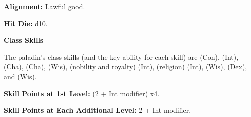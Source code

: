 
\textbf{Alignment:} Lawful good.

\textbf{Hit Die:} d10.

\textbf{Class Skills}

The paladin's class skills (and the key ability for each skill) are  
(Con),  (Int),  (Cha),  (Cha),  (Wis),  
(nobility and royalty) (Int),  (religion) (Int),  (Wis),  
(Dex), and  (Wis).

\textbf{Skill Points at 1st Level:} (2 + Int modifier) x4.

\textbf{Skill Points at Each Additional Level:} 2 + Int modifier.

